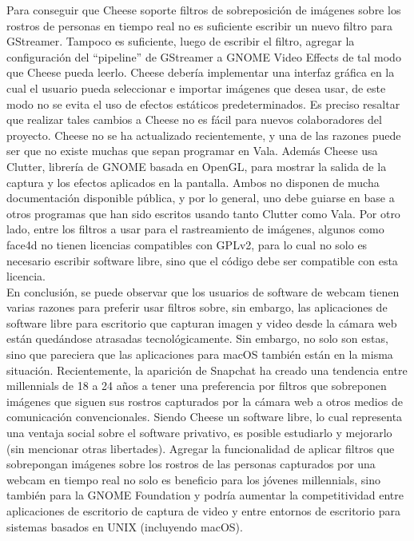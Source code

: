 \documentclass[a4paper,openright,12pt]{report}
\begin{document}
Para conseguir que Cheese soporte filtros de sobreposición de imágenes sobre los
rostros de personas en tiempo real no es suficiente escribir un nuevo filtro
para GStreamer. Tampoco es suficiente, luego de escribir el filtro, agregar la
configuración del “pipeline” de GStreamer a GNOME Video Effects de tal modo que
Cheese pueda leerlo. Cheese debería implementar una interfaz gráfica en la cual
el usuario pueda seleccionar e importar imágenes que desea usar, de este modo no
se evita el uso de efectos estáticos predeterminados. Es preciso resaltar que
realizar tales cambios a Cheese no es fácil para nuevos colaboradores del
proyecto. Cheese no se ha actualizado recientemente, y una de las razones puede
ser que no existe muchas que sepan programar en Vala. Además Cheese usa Clutter,
librería de GNOME basada en OpenGL, para mostrar la salida de la captura y los
efectos aplicados en la pantalla. Ambos no disponen de mucha documentación
disponible pública, y por lo general, uno debe guiarse en base a otros programas
que han sido escritos usando tanto Clutter como Vala. Por otro lado, entre los
filtros a usar para el rastreamiento de imágenes, algunos como face4d no tienen
licencias compatibles con GPLv2, para lo cual no solo es necesario escribir
software libre, sino que el código debe ser compatible con esta licencia.\\

En conclusión, se puede observar que los usuarios de software de webcam tienen
varias razones para preferir usar filtros sobre, sin embargo, las aplicaciones
de software libre para escritorio que capturan imagen y video desde la cámara
web están quedándose atrasadas tecnológicamente. Sin embargo, no solo son estas,
sino que pareciera que las aplicaciones para macOS también están en la misma
situación. Recientemente, la aparición de Snapchat ha creado una tendencia entre
millennials de 18 a 24 años a tener una preferencia por filtros que sobreponen
imágenes que siguen sus rostros capturados por la cámara web a otros medios
de comunicación convencionales. Siendo Cheese un software libre, lo cual
representa una ventaja social sobre el software privativo, es posible estudiarlo
y mejorarlo (sin mencionar otras libertades). Agregar la funcionalidad de
aplicar filtros que sobrepongan imágenes sobre los rostros de las personas
capturados por una webcam en tiempo real no solo es beneficio para los jóvenes
millennials, sino también para la GNOME Foundation y podría aumentar la
competitividad entre aplicaciones de escritorio de captura de video y entre
entornos de escritorio para sistemas basados en UNIX (incluyendo macOS).
\end{document}
